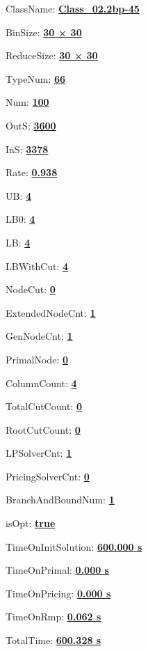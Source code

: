 \documentclass[11pt]{article}
\begin{document}
\pagestyle{empty}


ClassName: \underline{\textbf{Class_02.2bp-45}}
\par
BinSize: \underline{\textbf{30 × 30}}
\par
ReduceSize: \underline{\textbf{30 × 30}}
\par
TypeNum: \underline{\textbf{66}}
\par
Num: \underline{\textbf{100}}
\par
OutS: \underline{\textbf{3600}}
\par
InS: \underline{\textbf{3378}}
\par
Rate: \underline{\textbf{0.938}}
\par
UB: \underline{\textbf{4}}
\par
LB0: \underline{\textbf{4}}
\par
LB: \underline{\textbf{4}}
\par
LBWithCut: \underline{\textbf{4}}
\par
NodeCut: \underline{\textbf{0}}
\par
ExtendedNodeCnt: \underline{\textbf{1}}
\par
GenNodeCnt: \underline{\textbf{1}}
\par
PrimalNode: \underline{\textbf{0}}
\par
ColumnCount: \underline{\textbf{4}}
\par
TotalCutCount: \underline{\textbf{0}}
\par
RootCutCount: \underline{\textbf{0}}
\par
LPSolverCnt: \underline{\textbf{1}}
\par
PricingSolverCnt: \underline{\textbf{0}}
\par
BranchAndBoundNum: \underline{\textbf{1}}
\par
isOpt: \underline{\textbf{true}}
\par
TimeOnInitSolution: \underline{\textbf{600.000 s}}
\par
TimeOnPrimal: \underline{\textbf{0.000 s}}
\par
TimeOnPricing: \underline{\textbf{0.000 s}}
\par
TimeOnRmp: \underline{\textbf{0.062 s}}
\par
TotalTime: \underline{\textbf{600.328 s}}
\par
\newpage
\end{document}
